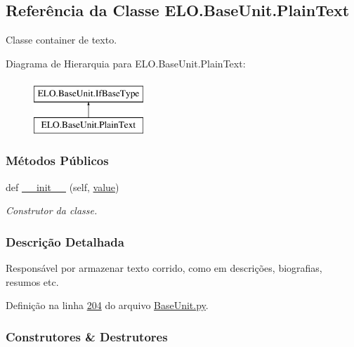 \hypertarget{classELO_1_1BaseUnit_1_1PlainText}{}\subsection{Referência da Classe E\+L\+O.\+Base\+Unit.\+Plain\+Text}
\label{classELO_1_1BaseUnit_1_1PlainText}


Classe container de texto.  


Diagrama de Hierarquia para E\+L\+O.\+Base\+Unit.\+Plain\+Text\+:\begin{figure}[H]
\begin{center}
\leavevmode
\includegraphics[height=2.000000cm]{d4/d2d/classELO_1_1BaseUnit_1_1PlainText}
\end{center}
\end{figure}
\subsubsection*{Métodos Públicos}
\begin{DoxyCompactItemize}
\item 
def \hyperlink{classELO_1_1BaseUnit_1_1PlainText_a7abd53e71b4a59f484fdd94d7b26eac4}{\+\_\+\+\_\+init\+\_\+\+\_\+} (self, \hyperlink{classELO_1_1BaseUnit_1_1IfBaseType_a2534c3548a8e5991dde0a64b4f0b542b}{value})
\begin{DoxyCompactList}\small\item\em Construtor da classe. \end{DoxyCompactList}\end{DoxyCompactItemize}


\subsubsection{Descrição Detalhada}
Responsável por armazenar texto corrido, como em descrições, biografias, resumos etc. 

Definição na linha \hyperlink{BaseUnit_8py_source_l00204}{204} do arquivo \hyperlink{BaseUnit_8py_source}{Base\+Unit.\+py}.



\subsubsection{Construtores \& Destrutores}
\hypertarget{classELO_1_1BaseUnit_1_1PlainText_a7abd53e71b4a59f484fdd94d7b26eac4}{}
